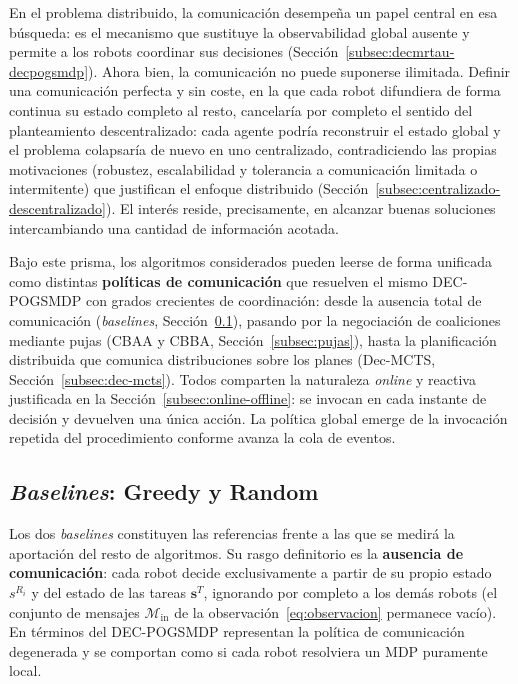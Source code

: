 En el problema distribuido, la comunicación desempeña un papel central en esa búsqueda: es el mecanismo que sustituye la observabilidad global ausente y permite a los robots coordinar sus decisiones (Sección~\ref{subsec:decmrtau-decpogsmdp}). Ahora bien, la comunicación no puede suponerse ilimitada. Definir una comunicación perfecta y sin coste, en la que cada robot difundiera de forma continua su estado completo al resto, cancelaría por completo el sentido del planteamiento descentralizado: cada agente podría reconstruir el estado global y el problema colapsaría de nuevo en uno centralizado, contradiciendo las propias motivaciones (robustez, escalabilidad y tolerancia a comunicación limitada o intermitente) que justifican el enfoque distribuido (Sección~\ref{subsec:centralizado-descentralizado}). El interés reside, precisamente, en alcanzar buenas soluciones intercambiando una cantidad de información acotada.
 
Bajo este prisma, los algoritmos considerados pueden leerse de forma unificada como distintas \textbf{políticas de comunicación} que resuelven el mismo DEC-POGSMDP con grados crecientes de coordinación: desde la ausencia total de comunicación (\textit{baselines}, Sección~\ref{subsec:baselines}), pasando por la negociación de coaliciones mediante pujas (CBAA y CBBA, Sección~\ref{subsec:pujas}), hasta la planificación distribuida que comunica distribuciones sobre los planes (Dec-MCTS, Sección~\ref{subsec:dec-mcts}). Todos comparten la naturaleza \textit{online} y reactiva justificada en la Sección~\ref{subsec:online-offline}: se invocan en cada instante de decisión y devuelven una única acción. La política global emerge de la invocación repetida del procedimiento conforme avanza la cola de eventos.

\subsection{\textit{Baselines}: Greedy y Random} \label{subsec:baselines}

Los dos \textit{baselines} constituyen las referencias frente a las que se medirá la aportación del resto de algoritmos. Su rasgo definitorio es la \textbf{ausencia de comunicación}: cada robot decide exclusivamente a partir de su propio estado $s^{R_i}$ y del estado de las tareas $\mathbf{s}^{T}$, ignorando por completo a los demás robots (el conjunto de mensajes $\mathcal{M}_{\mathrm{in}}$ de la observación~\eqref{eq:observacion} permanece vacío). En términos del DEC-POGSMDP representan la política de comunicación degenerada y se comportan como si cada robot resolviera un MDP puramente local.

